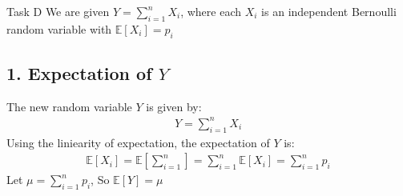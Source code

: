 \begin{task}{Task D}
	We are given $Y = \sum^n_{i=1}X_i$, where each $X_i$ is an independent Bernoulli random variable with $\mathds{E}[X_i] = p_i$
	\subsection*{1. Expectation of $Y$}
	The new random variable $Y$ is given by:
	\begin{align}
		Y = \sum^n_{i=1}X_i
	\end{align}
	Using the liniearity of expectation, the expectation of $Y$ is:
	\begin{align}
		\mathds{E}[X_i] = \mathds{E}\left[\sum_{i=1}^{n}\right] = \sum_{i=1}^{n}\mathds{E}[X_i] = \sum_{i=1}^{n}p_i
	\end{align}
	Let $\mu = \sum_{i=1}^{n}p_i$, So $\mathds{E}[Y]=\mu$

\end{task}

